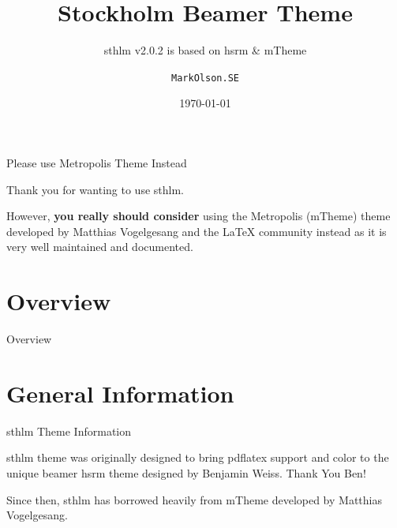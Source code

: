 \documentclass[newPxFont,numfooter,sectionpages]{beamer}
\title{Stockholm Beamer Theme}
\subtitle{sthlm v2.0.2 is based on hsrm \& mTheme}
\date{\today}
\author{\texttt{MarkOlson.SE}}
\institute{Made in \textit{Sweden} \par \small{File: \jobname}}
\begin{document}
%
%

\maketitle

\begingroup
{}
\begin{frame}{Please use Metropolis Theme Instead}

Thank you for wanting to use sthlm.

\vspace{1em}

However, \textbf{you really should consider} using the Metropolis (mTheme) theme developed by Matthias Vogelgesang and the LaTeX community instead as it is very well maintained and documented.

\begin{center}
\end{center}
\end{frame}
\endgroup


%
%

\section*{Overview}
\begin{frame}{Overview}
\tableofcontents[hideallsubsections]
\end{frame}

%
%

\section{General Information}


\begin{frame}[c]{sthlm Theme Information}

\alert{sthlm} theme was originally designed to bring pdflatex support and color to the unique beamer \alert{hsrm} theme designed by Benjamin Weiss.  Thank You Ben!   

\begin{center}
\end{center}

Since then, \alert{sthlm} has borrowed heavily from \alert{mTheme} developed by Matthias Vogelgesang.  

\end{frame}
\end{document}
